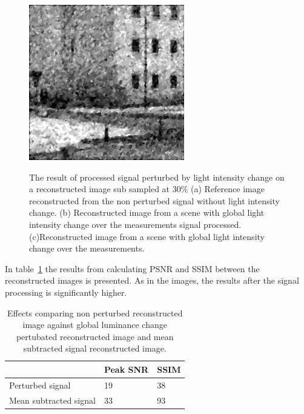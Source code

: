 \begin{figure}[H]
\begin{minipage}[t]{0.32\textwidth}
    \subcaption{}
    \label{fig:lum_4}
\end{minipage}
\begin{minipage}[t]{0.32\textwidth}
    \includegraphics[width = \textwidth]{result/dynamic/lum/intense_change_psnr_19_snr_14_sssim_38.png}
    \subcaption{}
    \label{fig:lum_32}
\end{minipage}
    \caption{The result of processed signal perturbed by light intensity change on a reconstructed image sub sampled at 30\% (a) Reference image reconstructed from the non perturbed signal without light intensity change. (b) Reconstructed image from a scene with global light intensity change over the measurements signal processed. (c)Reconstructed image from a scene with global light intensity change over the measurements.}
    \label{fig:lum_rec}
\end{figure}

In table~\ref{tab:lum_dyn} the results from calculating PSNR and SSIM between the reconstructed images is presented. As in the images, the results after the signal processing is significantly higher.


\begin{table}[H]
    \centering
  \begin{tabular}{ | l | l | l |}
    \hline
     & Peak SNR  & SSIM \\ \hline
    Perturbed signal & 19  & 38 \\ \hline
    Mean subtracted signal & 33  & 93 \\
    \hline
  \end{tabular}
      \caption{Effects comparing non perturbed reconstructed image against global luminance change pertubated reconstructed image and mean subtracted signal reconstructed image.}
    \label{tab:lum_dyn}
\end{table}




